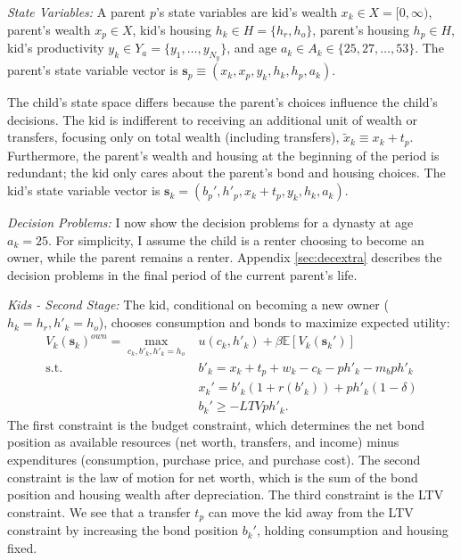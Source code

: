 \documentclass[12pt]{article}
\newcommand{\E}{\mathbb{E}}
\begin{document}
\textit{State Variables:}  A parent $p$'s state variables are  kid's wealth $x_k\in X=[0,\infty)$, parent's wealth $x_p\in X$, kid's housing $h_k\in H = \{h_r,h_o\}$, parent's housing $h_p\in H$, kid's productivity $y_k\in Y_a=\{y_1,\dots,y_{N_y}\}$, and age $a_k\in A_k\in\{25,27,\dots,53\}$. The parent's state variable vector is  $\mathbf{s}_p\equiv\left(x_k,x_p,y_k,h_k,h_p,a_k\right)$. 

The child's state space differs because the parent's choices influence the child's decisions. The kid is indifferent to receiving an additional unit of wealth or transfers, focusing only on total wealth (including transfers), $\tilde x_k\equiv x_k+t_p$. Furthermore, the parent's wealth and housing at the beginning of the period is redundant; the kid only cares about the parent's bond and housing choices. The kid's state variable vector is $\mathbf{s}_k=\left(b_p',h'_p,x_k+t_p,y_k,h_k,a_k\right)$. 

\textit{Decision Problems:} 
I now show the decision problems for a dynasty at age $a_k=25$. For simplicity, I assume the child is a renter choosing to become an owner, while the parent remains a renter. Appendix \ref{sec:decextra} describes the decision problems in the final period of the current parent's life.

\textit{Kids - Second Stage:} The kid, conditional on becoming a new owner ($h_k=h_r,h'_k=h_o$), chooses consumption and bonds to maximize expected utility:
\begin{equation}\label{eq:Vk}
\begin{split}
 V_k(\mathbf{s}_k)^{own} = \max_{c_k,b'_k,h'_k=h_o} & u(c_k,h'_k)  + \beta \E\left[V_{k}(\mathbf{s}_k') \right]  \\ 
 \text{s.t.}\quad & 	b'_k = x_k + t_p + w_k - c_k - p h'_k - m_b p h'_k \\
 & x_k' = b'_k(1+r(b'_k)) + p h'_k(1-\delta) \\
 & b_k' \ge - LTV  p h'_k. 
\end{split}
\end{equation}
The first constraint is the budget constraint, which determines the net bond position as available resources (net worth, transfers, and income) minus expenditures (consumption, purchase price, and purchase cost). The second constraint is the law of motion for net worth, which is the sum of the bond position and housing wealth after depreciation. The third constraint is the LTV constraint. We see that a transfer $t_p$ can move the kid away from the LTV constraint by increasing the bond position $b_k'$, holding consumption and housing fixed. 
\end{document}
